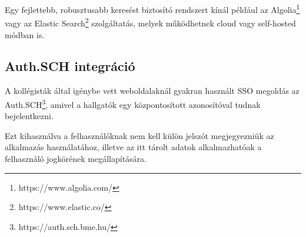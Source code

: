 Egy fejlettebb, robusztusabb keresést biztosító rendszert kínál például az Algolia\footnote{https://www.algolia.com/} vagy az Elastic Search\footnote{https://www.elastic.co/} szolgáltatás,
melyek működhetnek cloud vagy self-hosted módban is.

\subsection{Auth.SCH integráció}

A kollégisták által igénybe vett weboldalaknál gyakran használt SSO megoldás az Auth.SCH\footnote{https://auth.sch.bme.hu/}, amivel
a hallgatók egy központosított azonosítóval tudnak bejelentkezni.

Ezt kihasználva a felhasználóknak nem kell külön jelszót megjegyezniük az alkalmazás használatához,
illetve az itt tárolt adatok alkalmazhatóak a felhasználó jogkörének megállapítására.
